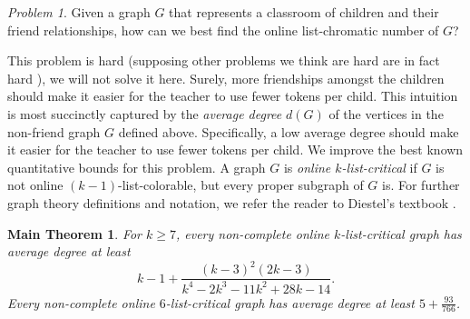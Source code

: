 \documentclass[12pt]{article}
\theoremstyle{plain}
\newtheorem*{MainTheorem}{Main Theorem}
\theoremstyle{definition}
\theoremstyle{remark}
\newtheorem*{problem}{Problem}
\begin{document}
\begin{problem}
Given a graph $G$ that represents a classroom of children and their friend relationships, how can we best find the online list-chromatic number of $G$?
\end{problem}
This problem is hard (supposing other problems we think are hard are in fact hard \cite{gutowskiline}), we will not solve it here.  Surely, more friendships 
amongst the children should make it easier for the teacher to use fewer tokens per child.  This intuition is most succinctly captured by the 
\emph{average degree} $d(G)$ of the vertices in the non-friend graph $G$ defined above.  
Specifically, a low average degree should make it easier for the teacher to use fewer tokens per child.  We improve the best known quantitative bounds for this problem.
A graph $G$ is \emph{online $k$-list-critical} if $G$ is not online $(k-1)$-list-colorable, but every proper subgraph of $G$ is.
For further graph theory definitions and notation, we refer the reader to Diestel's textbook \cite{diestel2010}.

\begin{MainTheorem}
For $k \ge 7$, every non-complete online $k$-list-critical graph has average degree at least \[k-1 + \frac{(k-3)^2 (2 k-3)}{k^4-2 k^3-11 k^2+28 k-14}.\]
Every non-complete online $6$-list-critical graph has average degree at least $5 + \frac{93}{766}$.
\end{MainTheorem}
\end{document}
